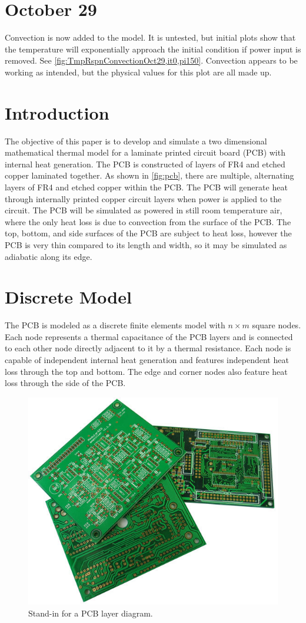 \documentclass[10pt,twocolumn]{article}
\begin{document}
\section{October 29}
Convection is now added to the model. It is untested, but initial plots show that the temperature will exponentially approach the initial condition if power input is removed. See \autoref{fig:TmpRspnConvectionOct29,it0,pi150}. Convection appears to be working as intended, but the physical values for this plot are all made up.

\section{Introduction}
The objective of this paper is to develop and simulate a two dimensional mathematical thermal model for a laminate printed circuit board (PCB) with internal heat generation. The PCB is constructed of layers of FR4 and etched copper laminated together. As shown in \autoref{fig:pcb}, there are multiple, alternating layers of FR4 and etched copper within the PCB. The PCB will generate heat through internally printed copper circuit layers when power is applied to the circuit. The PCB will be simulated as powered in still room temperature air, where the only heat loss is due to convection from the surface of the PCB. The top, bottom, and side surfaces of the PCB are subject to heat loss, however the PCB is very thin compared to its length and width, so it may be simulated as adiabatic along its edge.

\section{Discrete Model}
The PCB is modeled as a discrete finite elements model with $n \times m$ square nodes. Each node represents a thermal capacitance of the PCB layers and is connected to each other node directly adjacent to it by a thermal resistance. Each node is capable of independent internal heat generation and features independent heat loss through the top and bottom. The edge and corner nodes also feature heat loss through the side of the PCB.

\begin{figure}
	\center
	\includegraphics[width=0.6\linewidth]{pcb}
	\caption{Stand-in for a PCB layer diagram.}
	\label{fig:pcb}
\end{figure}
\end{document}
